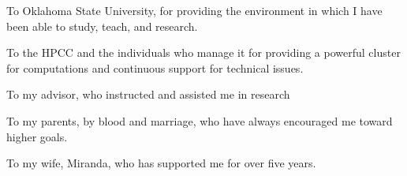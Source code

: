 \begin{acknowledge}

To Oklahoma State University, for providing the environment in which I have been able to study, teach, and research.

To the HPCC and the individuals who manage it for providing a powerful cluster for computations and continuous support for technical issues.

To my advisor, who instructed and assisted me in research

To my parents, by blood and marriage, who have always encouraged me toward higher goals.

To my wife, Miranda, who has supported me for over five years. 


\end{acknowledge}
